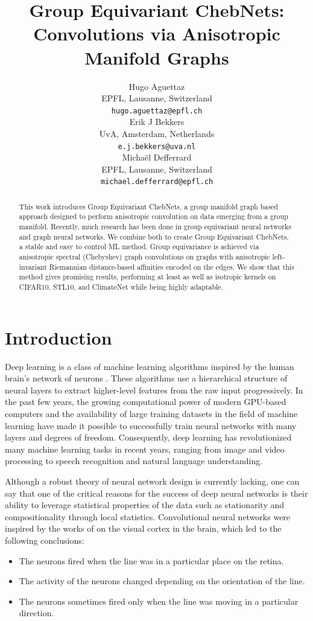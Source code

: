 \documentclass{article}
\title{Group Equivariant ChebNets: Convolutions via Anisotropic Manifold Graphs}
\author{%
  Hugo Aguettaz \\
  EPFL, Lausanne, Switzerland \\
  \texttt{hugo.aguettaz@epfl.ch} \\
  \And
  Erik J Bekkers \\
  UvA, Amsterdam, Netherlands \\
  \texttt{e.j.bekkers@uva.nl} \\
  \AND
  Michaël Defferrard \\
  EPFL, Lausanne, Switzerland \\
  \texttt{michael.defferrard@epfl.ch} \\
}
\begin{document}
\maketitle

\begin{abstract}
    This work introduces Group Equivariant ChebNets, a group manifold graph based approach designed to perform anisotropic convolution on data emerging from a group manifold. Recently, much research has been done in group equivariant neural networks and graph neural networks. We combine both to create Group Equivariant ChebNets, a stable and easy to control ML method.  Group equivariance is achieved via anisotropic spectral (Chebyshev) graph convolutions on graphs with anisotropic left-invariant Riemannian distance-based affinities encoded on the edges. We show that this method gives promising results, performing at least as well as isotropic kernels on CIFAR10, STL10, and ClimateNet while being highly adaptable.
\end{abstract}

\section{Introduction} \label{sec:introduction}

Deep learning is a class of machine learning algorithms inspired by the human brain's network of neurons \citep{goodfellow2016deep}. These algorithms use a hierarchical structure of neural layers to extract higher-level features from the raw input progressively. In the past few years, the growing computational power of modern GPU-based computers and the availability of large training datasets in the field of machine learning have made it possible to successfully train neural networks with many layers and degrees of freedom. Consequently, deep learning has revolutionized many machine learning tasks in recent years, ranging from image and video processing to speech recognition and natural language understanding.

Although a robust theory of neural network design is currently lacking, one can say that one of the critical reasons for the success of deep neural networks is their ability to leverage statistical properties of the data such as stationarity and compositionality through local statistics. Convolutional neural networks were inspired by the works of \citet{hubel1962receptive} on the visual cortex in the brain, which led to the following conclusions:
\begin{itemize}
\item The neurons fired when the line was in a particular place on the retina.
\item The activity of the neurons changed depending on the orientation of the line.
\item The neurons sometimes fired only when the line was moving in a particular direction.
\end{itemize}
\end{document}
